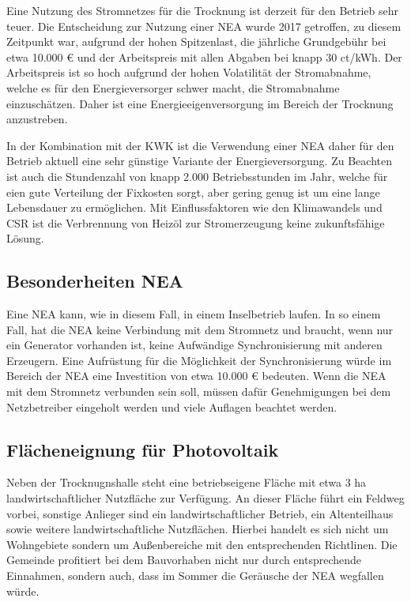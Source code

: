 \documentclass[11pt]{scrartcl}
\begin{document}
Eine Nutzung des Stromnetzes für die Trocknung ist derzeit für den Betrieb sehr teuer.
Die Entscheidung zur Nutzung einer \ac{NEA} wurde 2017 getroffen, zu diesem Zeitpunkt war, aufgrund der hohen Spitzenlast, die jährliche Grundgebühr bei etwa 10.000 € und der Arbeitspreis mit allen Abgaben bei knapp 30 ct/kWh.
Der Arbeitspreis ist so hoch aufgrund der hohen Volatilität der Stromabnahme, welche es für den Energieversorger schwer macht, die Stromabnahme einzuschätzen.
Daher ist eine Energieeigenversorgung im Bereich der Trocknung anzustreben.

In der Kombination mit der \ac{KWK} ist die Verwendung einer \ac{NEA} daher für den Betrieb aktuell eine sehr günstige Variante der Energieversorgung.
Zu Beachten ist auch die Stundenzahl von knapp 2.000 Betriebsstunden im Jahr, welche für eien gute Verteilung der Fixkosten sorgt, aber gering genug ist um eine lange Lebensdauer zu ermöglichen.
Mit Einflussfaktoren wie den  Klimawandels und \ac{CSR} ist die Verbrennung von Heizöl zur Stromerzeugung keine zukunftsfähige Lösung.

\subsection{Besonderheiten NEA}
\label{subsec:NEA}
Eine \ac{NEA} kann, wie in diesem Fall, in einem Inselbetrieb laufen.
In so einem Fall, hat die \ac{NEA} keine Verbindung mit dem Stromnetz und braucht, wenn nur ein Generator vorhanden ist, keine Aufwändige Synchronisierung mit anderen Erzeugern.
Eine Aufrüstung für die Möglichkeit der Synchronisierung würde im Bereich der \ac{NEA} eine Investition von etwa 10.000 € bedeuten.
Wenn die \ac{NEA} mit dem Stromnetz verbunden sein soll, müssen dafür Genehmigungen bei dem Netzbetreiber eingeholt werden und viele Auflagen beachtet werden.


\subsection{Flächeneignung für Photovoltaik}
Neben der Trocknugnshalle steht eine betriebseigene Fläche mit etwa 3 ha landwirtschaftlicher Nutzfläche zur Verfügung.
An dieser Fläche führt ein Feldweg vorbei, sonstige Anlieger sind ein landwirtschaftlicher Betrieb, ein Altenteilhaus sowie weitere landwirtschaftliche Nutzflächen.
Hierbei handelt es sich nicht um Wohngebiete sondern um Außenbereiche mit den entsprechenden Richtlinen.
Die Gemeinde profitiert bei dem Bauvorhaben nicht nur durch entsprechende Einnahmen, sondern auch, dass im Sommer die Geräusche der \ac{NEA} wegfallen würde.
\end{document}
